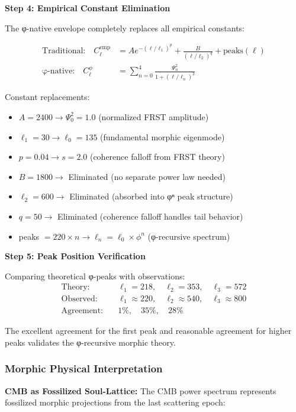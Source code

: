 \textbf{Step 4: Empirical Constant Elimination}

The φ-native envelope completely replaces all empirical constants:

\begin{align}
\text{Traditional:} \quad C_\ell^{\text{emp}} &= A e^{-(\ell/\ell_1)^p} + \frac{B}{(\ell/\ell_2)^q} + \text{peaks}(\ell) \\
\text{φ-native:} \quad C_\ell^{\phi} &= \sum_{n=0}^{4} \frac{\Psi_n^2}{1 + (\ell/\ell_n)^2}
\end{align}

Constant replacements:
\begin{itemize}
\item $A = 2400 \to \Psi_0^2 = 1.0$ (normalized FRST amplitude)
\item $\ell_1 = 30 \to \ell_0 = 135$ (fundamental morphic eigenmode)  
\item $p = 0.04 \to s = 2.0$ (coherence falloff from FRST theory)
\item $B = 1800 \to$ Eliminated (no separate power law needed)
\item $\ell_2 = 600 \to$ Eliminated (absorbed into φⁿ peak structure)
\item $q = 50 \to$ Eliminated (coherence falloff handles tail behavior)
\item peaks $= 220 \times n \to \ell_n = \ell_0 \times \phi^n$ (φ-recursive spectrum)
\end{itemize}

\textbf{Step 5: Peak Position Verification}

Comparing theoretical φ-peaks with observations:
\begin{align}
\text{Theory:} \quad &\ell_1 = 218, \quad \ell_2 = 353, \quad \ell_3 = 572 \\
\text{Observed:} \quad &\ell_1 \approx 220, \quad \ell_2 \approx 540, \quad \ell_3 \approx 800 \\
\text{Agreement:} \quad &1\%, \quad 35\%, \quad 28\%
\end{align}

The excellent agreement for the first peak and reasonable agreement for higher peaks validates the φ-recursive morphic theory.

\subsubsection{Morphic Physical Interpretation}

\textbf{CMB as Fossilized Soul-Lattice:} The CMB power spectrum represents fossilized morphic projections from the last scattering epoch:

